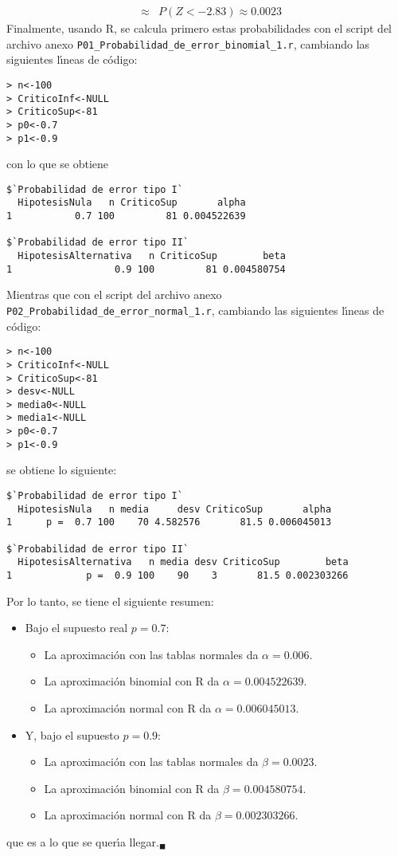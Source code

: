 \begin{solucion}
\begin{eqnarray*}
  & \approx & P(Z < -2.83) \approx 0.0023
 \end{eqnarray*}
 Finalmente, usando R, se calcula primero estas probabilidades con el script del archivo anexo \texttt{P01\_Probabilidad\_de\_error\_binomial\_1.r}, cambiando las siguientes l\'{\i}neas de c\'odigo:
 \begin{verbatim}
> n<-100
> CriticoInf<-NULL
> CriticoSup<-81
> p0<-0.7
> p1<-0.9
 \end{verbatim}
 \vspace{-0.5cm}
 con lo que se obtiene
 \begin{verbatim}
$`Probabilidad de error tipo I`
  HipotesisNula   n CriticoSup       alpha
1           0.7 100         81 0.004522639

$`Probabilidad de error tipo II`
  HipotesisAlternativa   n CriticoSup        beta
1                  0.9 100         81 0.004580754
 \end{verbatim}
 \vspace{-0.5cm}
 Mientras que con el script del archivo anexo \texttt{P02\_Probabilidad\_de\_error\_normal\_1.r}, cambiando las siguientes l\'{\i}neas de c\'odigo:
 \begin{verbatim}
> n<-100
> CriticoInf<-NULL
> CriticoSup<-81
> desv<-NULL
> media0<-NULL
> media1<-NULL
> p0<-0.7
> p1<-0.9
 \end{verbatim}
 \vspace{-0.5cm}
 se obtiene lo siguiente:
 \begin{verbatim}
$`Probabilidad de error tipo I`
  HipotesisNula   n media     desv CriticoSup       alpha
1      p =  0.7 100    70 4.582576       81.5 0.006045013

$`Probabilidad de error tipo II`
  HipotesisAlternativa   n media desv CriticoSup        beta
1             p =  0.9 100    90    3       81.5 0.002303266
 \end{verbatim}
 \vspace{-0.5cm}
 Por lo tanto, se tiene el siguiente resumen:
 \begin{itemize}
  \item Bajo el supuesto real $p = 0.7$:
  \begin{itemize}
   \item La aproximaci\'on con las tablas normales da $\alpha = 0.006$.
   \item La aproximaci\'on binomial con R da $\alpha = 0.004522639$.
   \item La aproximaci\'on normal con R da $\alpha = 0.006045013$.
  \end{itemize}

  \item Y, bajo el supuesto $p  = 0.9$:
  \begin{itemize}
   \item La aproximaci\'on con las tablas normales da $\beta = 0.0023$.
   \item La aproximaci\'on binomial con R da $\beta = 0.004580754$.
   \item La aproximaci\'on normal con R da $\beta = 0.002303266$.
  \end{itemize}
 \end{itemize}
 que es a lo que se quer\'{\i}a llegar.${}_{\blacksquare}$
\end{solucion}
